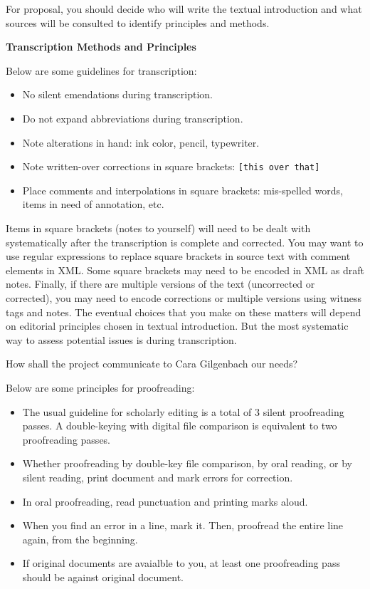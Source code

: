 \documentclass[9pt,oneside,notitlepageletterpaperopenright]{article}
\begin{document}
For proposal, you should decide who will write the textual introduction
and what sources will be consulted to identify principles and methods.

\textbf{Transcription Methods and Principles}

Below are some guidelines for transcription:

\begin{itemize}
\itemsep1pt\parskip0pt
\item
  No silent emendations during transcription.
\item
  Do not expand abbreviations during transcription.
\item
  Note alterations in hand: ink color, pencil, typewriter.
\item
  Note written-over corrections in square brackets:
  \texttt{{[}this over that{]}}
\item
  Place comments and interpolations in square brackets: mis-spelled
  words, items in need of annotation, etc.
\end{itemize}

Items in square brackets (notes to yourself) will need to be dealt with
systematically after the transcription is complete and corrected. You
may want to use regular expressions to replace square brackets in source
text with comment elements in XML. Some square brackets may need to be
encoded in XML as draft notes. Finally, if there are multiple versions
of the text (uncorrected or corrected), you may need to encode
corrections or multiple versions using witness tags and notes. The
eventual choices that you make on these matters will depend on editorial
principles chosen in textual introduction. But the most systematic way
to assess potential issues is during transcription.

How shall the project communicate to Cara Gilgenbach our needs?

Below are some principles for proofreading:

\begin{itemize}
\itemsep1pt\parskip0pt
\item
  The usual guideline for scholarly editing is a total of 3 silent
  proofreading passes. A double-keying with digital file comparison is
  equivalent to two proofreading passes.
\item
  Whether proofreading by double-key file comparison, by oral reading,
  or by silent reading, print document and mark errors for correction.
\item
  In oral proofreading, read punctuation and printing marks aloud.
\item
  When you find an error in a line, mark it. Then, proofread the entire
  line again, from the beginning.
\item
  If original documents are avaialble to you, at least one proofreading
  pass should be against original document.
\end{itemize}
\end{document}
